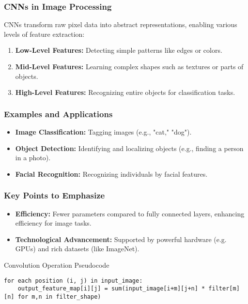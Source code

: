 \documentclass[aspectratio=169]{beamer}
\begin{document}
\begin{frame}[fragile]
    \frametitle{CNNs in Image Processing}
    CNNs transform raw pixel data into abstract representations, enabling various levels of feature extraction:
    \begin{enumerate}
        \item \textbf{Low-Level Features:} Detecting simple patterns like edges or colors.
        \item \textbf{Mid-Level Features:} Learning complex shapes such as textures or parts of objects.
        \item \textbf{High-Level Features:} Recognizing entire objects for classification tasks.
    \end{enumerate}
\end{frame}

\begin{frame}
    \frametitle{Examples and Applications}
    \begin{itemize}
        \item \textbf{Image Classification:} Tagging images (e.g., "cat," "dog").
        \item \textbf{Object Detection:} Identifying and localizing objects (e.g., finding a person in a photo).
        \item \textbf{Facial Recognition:} Recognizing individuals by facial features.
    \end{itemize}
\end{frame}

\begin{frame}[fragile]
    \frametitle{Key Points to Emphasize}
    \begin{itemize}
        \item \textbf{Efficiency:} Fewer parameters compared to fully connected layers, enhancing efficiency for image tasks.
        \item \textbf{Technological Advancement:} Supported by powerful hardware (e.g. GPUs) and rich datasets (like ImageNet).
    \end{itemize}
    \begin{block}{Convolution Operation Pseudocode}
        \begin{lstlisting}
for each position (i, j) in input_image:
    output_feature_map[i][j] = sum(input_image[i+m][j+n] * filter[m][n] for m,n in filter_shape)
        \end{lstlisting}
    \end{block}
\end{frame}
\end{document}
